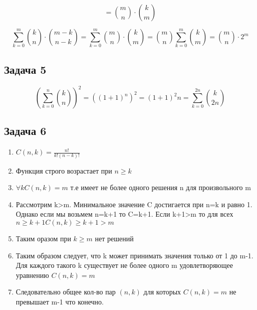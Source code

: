 \documentclass[a4paper,12pt]{article}
\begin{document}
\[
=\binom{m}{n}\cdot \binom{k}{m}
\]

\[
\sum_{k=0}^{m} \binom{k}{n}\cdot\binom{m-k}{n-k} = \sum_{k=0}^{m} \binom{m}{n}\cdot \binom{k}{m} = \binom{m}{n} \sum_{k=0}^{m} \binom{k}{m} = \binom{m}{n}\cdot 2^m
\]


\subsection{Задача 5}

\[
(\sum_{k=0}^{n} \binom{k}{n})^2 = ((1+1)^n)^2=(1+1)^2n= \sum_{k=0}^{2n} \binom{k}{2n}
\]

\subsection{Задача 6}
\begin{enumerate}
    \item $C(n, k) = \frac{n!}{k!(n-k)!}$
    \item Функция строго возрастает при $n\ge k$
    \item $\forall k C(n,k)=m$ т.е имеет не более одного решения n для произвольного m
    \item Рассмотрим k>m. Минимальное значение C достигается при n=k и равно 1. Однако если мы возьмем n=k+1 то C=k+1. Если k+1>m то для всех $n\ge k+1 C(n, k) \ge k+1 > m$
    \item Таким оразом при $k\ge m $ нет решений
    \item Таким образом следует, что k может принимать значения только от 1 до m-1. Для каждого такого k существует не более одного m удовлетворяющее уравнению $C(n, k)=m$
    \item Следовательно общее кол-во пар $(n, k)$ для которых $C(n, k)=m$ не превышает m-1 что конечно. 
\end{enumerate}
\end{document}
